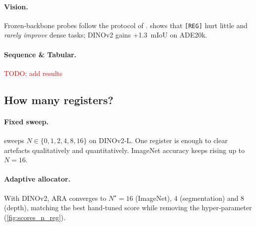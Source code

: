 \documentclass{article}
\newcommand{\RegTok}{\texttt{[REG]}\xspace}
\newcommand{\nreg}{N}
\newcommand{\citet}{\textcite}
\newcommand{\todo}[1]{\textcolor{red}{TODO: #1}}
\newcommand{\OURS}{\textsc{ARA}\xspace}
\begin{document}
\paragraph{Vision.}
Frozen‑backbone probes follow the protocol of \citet{darcetVisionTransformersNeed2024}.
 shows that \RegTok hurt little and \emph{rarely improve} dense tasks; DINOv2 gains +1.3 mIoU on ADE20k.


\paragraph{Sequence \& Tabular.} \todo{add results}



\subsection{How many registers?}
\paragraph{Fixed sweep.}
 sweeps $\nreg\in\{0,1,2,4,8,16\}$ on DINOv2‑L.
One register is enough to clear artefacts qualitatively and quantitatively. 
ImageNet accuracy keeps rising up to $\nreg=16$.

\vspace{-1em}
\paragraph{Adaptive allocator.}
With DINOv2, \OURS converges to $N^\star\!=\!16$ (ImageNet), 4 (segmentation) and 8 (depth), matching the best hand‑tuned score while removing the hyper‑parameter (\cref{fig:scores_n_reg}).
\end{document}
